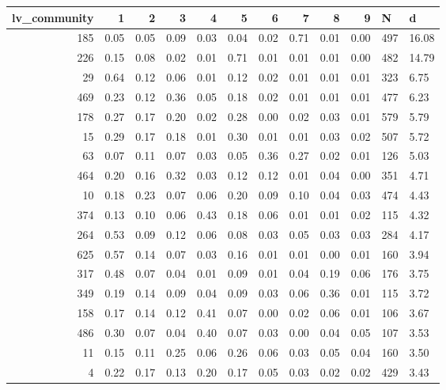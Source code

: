 \begin{tabular}{rrrrrrrrrrll}
\toprule
 lv\_community &    1 &    2 &    3 &    4 &    5 &    6 &    7 &    8 &    9 &   N &     d \\
\midrule
          185 & 0.05 & 0.05 & 0.09 & 0.03 & 0.04 & 0.02 & 0.71 & 0.01 & 0.00 & 497 & 16.08 \\
          226 & 0.15 & 0.08 & 0.02 & 0.01 & 0.71 & 0.01 & 0.01 & 0.01 & 0.00 & 482 & 14.79 \\
           29 & 0.64 & 0.12 & 0.06 & 0.01 & 0.12 & 0.02 & 0.01 & 0.01 & 0.01 & 323 &  6.75 \\
          469 & 0.23 & 0.12 & 0.36 & 0.05 & 0.18 & 0.02 & 0.01 & 0.01 & 0.01 & 477 &  6.23 \\
          178 & 0.27 & 0.17 & 0.20 & 0.02 & 0.28 & 0.00 & 0.02 & 0.03 & 0.01 & 579 &  5.79 \\
           15 & 0.29 & 0.17 & 0.18 & 0.01 & 0.30 & 0.01 & 0.01 & 0.03 & 0.02 & 507 &  5.72 \\
           63 & 0.07 & 0.11 & 0.07 & 0.03 & 0.05 & 0.36 & 0.27 & 0.02 & 0.01 & 126 &  5.03 \\
          464 & 0.20 & 0.16 & 0.32 & 0.03 & 0.12 & 0.12 & 0.01 & 0.04 & 0.00 & 351 &  4.71 \\
           10 & 0.18 & 0.23 & 0.07 & 0.06 & 0.20 & 0.09 & 0.10 & 0.04 & 0.03 & 474 &  4.43 \\
          374 & 0.13 & 0.10 & 0.06 & 0.43 & 0.18 & 0.06 & 0.01 & 0.01 & 0.02 & 115 &  4.32 \\
          264 & 0.53 & 0.09 & 0.12 & 0.06 & 0.08 & 0.03 & 0.05 & 0.03 & 0.03 & 284 &  4.17 \\
          625 & 0.57 & 0.14 & 0.07 & 0.03 & 0.16 & 0.01 & 0.01 & 0.00 & 0.01 & 160 &  3.94 \\
          317 & 0.48 & 0.07 & 0.04 & 0.01 & 0.09 & 0.01 & 0.04 & 0.19 & 0.06 & 176 &  3.75 \\
          349 & 0.19 & 0.14 & 0.09 & 0.04 & 0.09 & 0.03 & 0.06 & 0.36 & 0.01 & 115 &  3.72 \\
          158 & 0.17 & 0.14 & 0.12 & 0.41 & 0.07 & 0.00 & 0.02 & 0.06 & 0.01 & 106 &  3.67 \\
          486 & 0.30 & 0.07 & 0.04 & 0.40 & 0.07 & 0.03 & 0.00 & 0.04 & 0.05 & 107 &  3.53 \\
           11 & 0.15 & 0.11 & 0.25 & 0.06 & 0.26 & 0.06 & 0.03 & 0.05 & 0.04 & 160 &  3.50 \\
            4 & 0.22 & 0.17 & 0.13 & 0.20 & 0.17 & 0.05 & 0.03 & 0.02 & 0.02 & 429 &  3.43 \\

\end{tabular}
